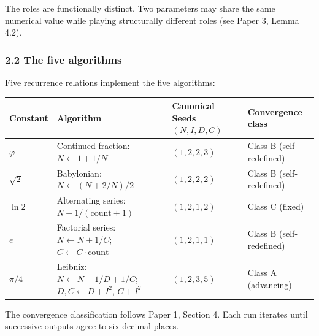 \documentclass[
  11pt,
  letterpaper,
]{article}
\begin{document}
The roles are functionally distinct. Two parameters may share the same
numerical value while playing structurally different roles (see Paper 3,
Lemma 4.2).

\subsubsection{2.2 The five algorithms}\label{the-five-algorithms}

Five recurrence relations implement the five algorithms:

\begin{longtable}[]{@{}
  >{\raggedright\arraybackslash}p{}
  >{\raggedright\arraybackslash}p{}
  >{\raggedright\arraybackslash}p{}
  >{\raggedright\arraybackslash}p{}@{}}
\toprule\noalign{}
\begin{minipage}[b]{\linewidth}\raggedright
Constant
\end{minipage} & \begin{minipage}[b]{\linewidth}\raggedright
Algorithm
\end{minipage} & \begin{minipage}[b]{\linewidth}\raggedright
Canonical Seeds \((N, I, D, C)\)
\end{minipage} & \begin{minipage}[b]{\linewidth}\raggedright
Convergence class
\end{minipage} \\
\midrule\noalign{}
\endhead
\bottomrule\noalign{}
\endlastfoot
\(\varphi\) & Continued fraction: \(N \leftarrow 1 + 1/N\) &
\((1, 2, 2, 3)\) & Class B (self-redefined) \\
\(\sqrt{2}\) & Babylonian: \(N \leftarrow (N + 2/N)/2\) &
\((1, 2, 2, 2)\) & Class B (self-redefined) \\
\(\ln 2\) & Alternating series: \(N \pm 1/(\text{count}+1)\) &
\((1, 2, 1, 2)\) & Class C (fixed) \\
\(e\) & Factorial series: \(N \leftarrow N + 1/C\);
\(C \leftarrow C \cdot \text{count}\) & \((1, 2, 1, 1)\) & Class B
(self-redefined) \\
\(\pi/4\) & Leibniz: \(N \leftarrow N - 1/D + 1/C\);
\(D, C \leftarrow D + I^2\), \(C + I^2\) & \((1, 2, 3, 5)\) & Class A
(advancing) \\
\end{longtable}

The convergence classification follows Paper 1, Section 4. Each run
iterates until successive outputs agree to six decimal places.
\end{document}

